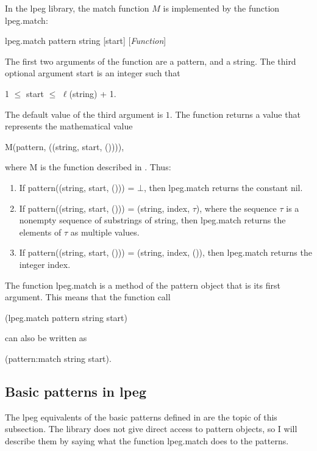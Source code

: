 \documentclass{article}
\begin{document}
In the \textsf{lpeg} library, the match function \(M\) is implemented
by the function \textsf{lpeg.match}:
\begin{flushleft}
  \textsf{lpeg.match pattern string [start]} \hfill
  [\textit{Function}]
\end{flushleft}
The first two arguments of the function are a pattern, and a string.
The third optional argument \textsf{start} is an integer such that
\begin{center}
  1 \(\leq\) \textsf{start} \(\leq\) \(\ell\)(\textsf{string}) + 1.
\end{center}
The default value of the third argument is \(1\).  The function
returns a value that represents the mathematical value
\begin{center}
  \textsf{M(pattern, ((string, start, ())))},
\end{center}
where \textsf{M} is the function described in .
Thus:
\begin{enumerate}
\item If \textsf{pattern((string, start, ())) = \(\bot\)}, then
  \textsf{lpeg.match} returns the constant \textsf{nil}.
\item If \textsf{pattern((string, start, ())) = (string, index,
    \(\tau\))}, where the sequence \(\tau\) is a nonempty sequence of
  substrings of \textsf{string}, then \textsf{lpeg.match} returns the
  elements of \(\tau\) as multiple values.
\item If \textsf{pattern((string, start, ())) = (string, index, ())},
  then \textsf{lpeg.match} returns the integer \textsf{index}.
\end{enumerate}

The function \textsf{lpeg.match} is a method of the pattern object
that is its first argument.  This means that the function call
\begin{center}
  \textsf{(lpeg.match pattern string start)}
\end{center}
can also be written as
\begin{center}
  \textsf{(pattern:match string start)}.
\end{center}

\subsection{Basic patterns in lpeg}
\label{sec:7l3dfnco}

The \textsf{lpeg} equivalents of the basic patterns defined in
 are the topic of this subsection.  The library
does not give direct access to pattern objects, so I will describe
them by saying what the function \textsf{lpeg.match} does to the
patterns.
\end{document}
